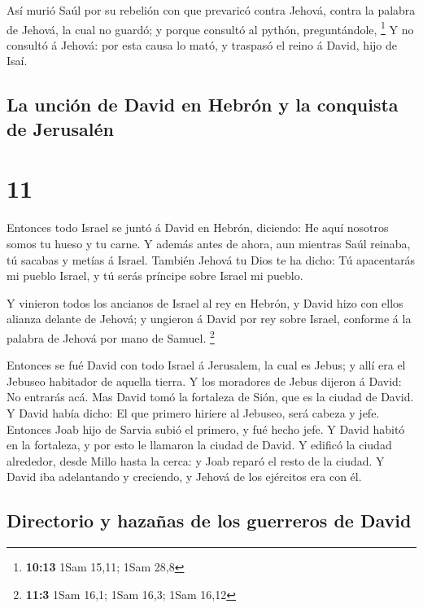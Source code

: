  Así murió Saúl por su rebelión con que prevaricó contra
Jehová, contra la palabra de Jehová, la cual no guardó; y porque
consultó al pythón, preguntándole, \footnote{\textbf{10:13} 1Sam 15,11;
  1Sam 28,8}  Y no consultó á Jehová: por esta causa lo
mató, y traspasó el reino á David, hijo de Isaí.

\hypertarget{la-unciuxf3n-de-david-en-hebruxf3n-y-la-conquista-de-jerusaluxe9n}{%
\subsection{La unción de David en Hebrón y la conquista de
Jerusalén}\label{la-unciuxf3n-de-david-en-hebruxf3n-y-la-conquista-de-jerusaluxe9n}}

\hypertarget{section-10}{%
\section{11}\label{section-10}}

 Entonces todo Israel se juntó á David en Hebrón,
diciendo: He aquí nosotros somos tu hueso y tu carne.  Y
además antes de ahora, aun mientras Saúl reinaba, tú sacabas y metías á
Israel. También Jehová tu Dios te ha dicho: Tú apacentarás mi pueblo
Israel, y tú serás príncipe sobre Israel mi pueblo.

 Y vinieron todos los ancianos de Israel al rey en Hebrón,
y David hizo con ellos alianza delante de Jehová; y ungieron á David por
rey sobre Israel, conforme á la palabra de Jehová por mano de Samuel.
\footnote{\textbf{11:3} 1Sam 16,1; 1Sam 16,3; 1Sam 16,12}

 Entonces se fué David con todo Israel á Jerusalem, la
cual es Jebus; y allí era el Jebuseo habitador de aquella tierra.
 Y los moradores de Jebus dijeron á David: No entrarás
acá. Mas David tomó la fortaleza de Sión, que es la ciudad de David.
 Y David había dicho: El que primero hiriere al Jebuseo,
será cabeza y jefe. Entonces Joab hijo de Sarvia subió el primero, y fué
hecho jefe.  Y David habitó en la fortaleza, y por esto le
llamaron la ciudad de David.  Y edificó la ciudad
alrededor, desde Millo hasta la cerca: y Joab reparó el resto de la
ciudad.  Y David iba adelantando y creciendo, y Jehová de
los ejércitos era con él.

\hypertarget{directorio-y-hazauxf1as-de-los-guerreros-de-david}{%
\subsection{Directorio y hazañas de los guerreros de
David}\label{directorio-y-hazauxf1as-de-los-guerreros-de-david}}

